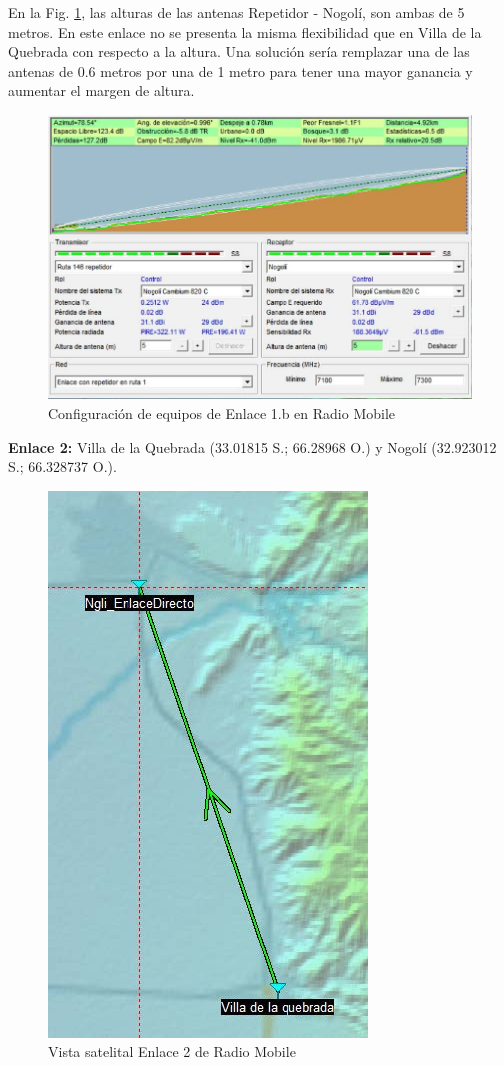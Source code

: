 \documentclass[12pt,a4paper]{book}
\begin{document}
En la Fig. \ref{fig_red_transporte_5}, las alturas de las antenas Repetidor - Nogolí, son ambas de 5 metros. En este enlace no se presenta la misma flexibilidad que en Villa de la Quebrada con respecto a la altura. Una solución sería remplazar una de las antenas de 0.6 metros por una de 1 metro para tener una mayor ganancia y aumentar el margen de altura.

\begin{figure} [H]
\centering
\includegraphics[width= 12 cm]{../figuras/red_transporte_5.jpg}
\caption{Configuración de equipos de Enlace 1.b en Radio Mobile}
\label{fig_red_transporte_5}
\end{figure}

\noindent\textbf{Enlace 2:} Villa de la Quebrada (33.01815 S.; 66.28968 O.) y Nogolí (32.923012 S.; 66.328737 O.).

\begin{figure} [H]
\centering
\includegraphics[width= 8 cm]{../figuras/red_transporte_6.jpg}
\caption{Vista satelital Enlace 2 de Radio Mobile}
\label{fig_red_transporte_6}
\end{figure}
\end{document}
